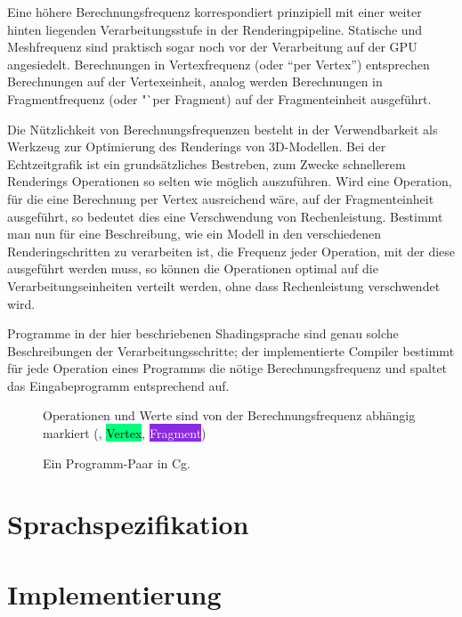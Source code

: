 \documentclass[twoside,a4paper,fleqn,12pt]{article}
\begin{document}
Eine höhere Berechnungsfrequenz korrespondiert prinzipiell mit einer weiter hinten liegenden Verarbeitungsstufe in der Renderingpipeline.
Statische und Meshfrequenz sind praktisch sogar noch vor der Verarbeitung auf der GPU angesiedelt. Berechnungen in Vertexfrequenz (oder "`per Vertex"')
entsprechen Berechnungen auf der Vertexeinheit, analog werden Berechnungen in Fragmentfrequenz (oder "`per Fragment) auf der Fragmenteinheit ausgeführt.

Die Nützlichkeit von Berechnungsfrequenzen besteht in der Verwendbarkeit als Werkzeug zur Optimierung des Renderings von 3D-Modellen.
Bei der Echtzeitgrafik ist ein grundsätzliches Bestreben, zum Zwecke schnellerem Renderings Operationen so selten wie möglich auszuführen.
Wird eine Operation, für die eine Berechnung per Vertex ausreichend wäre, auf der Fragmenteinheit ausgeführt, so bedeutet dies
eine Verschwendung von Rechenleistung. Bestimmt man nun für eine Beschreibung, wie ein Modell in den verschiedenen Renderingschritten zu
verarbeiten ist, die Frequenz jeder Operation, mit der diese ausgeführt werden muss, so können die Operationen optimal auf die
Verarbeitungseinheiten verteilt werden, ohne dass Rechenleistung verschwendet wird.

Programme in der hier beschriebenen Shadingsprache sind genau solche Beschreibungen der Verarbeitungsschritte; der implementierte Compiler
bestimmt für jede Operation eines Programms die nötige Berechnungsfrequenz und spaltet das Eingabeprogramm entsprechend auf.

\newcommand\freqPerMesh[1]{\framebox{#1}}
\newcommand\freqPerVert[1]{\colorbox{SpringGreen}{\textcolor{Black}{#1}}}
\newcommand\freqPerFrag[1]{\colorbox{BlueViolet}{\textcolor{White}{#1}}}
\begin{figure}[hp]
  
  \caption{Ein Programm-Paar in Cg.}
  \centering
  \small Operationen und Werte sind von der Berechnungsfrequenz abhängig markiert (\freqPerMesh{Mesh}, \freqPerVert{Vertex}, \freqPerFrag{Fragment})
  \label{fig:simple_cg}
\end{figure}

\newpage
\section{Sprachspezifikation}
\label{langspec}



\section{Implementierung}
\label{implementation}
\end{document}
